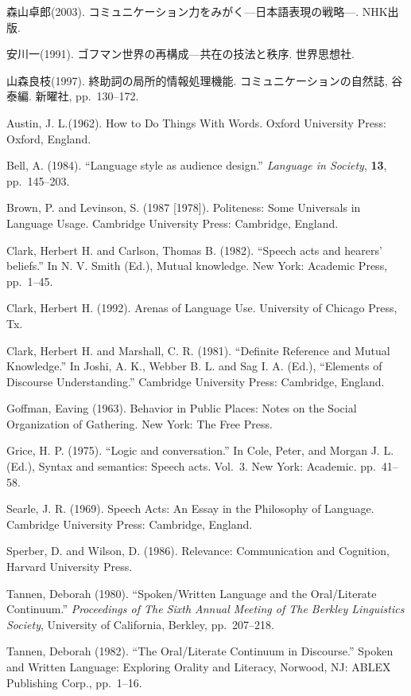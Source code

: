\documentclass[japanese]{jnlp_1.3c}
\begin{document}
\begin{thebibliography}{3}
森山卓郎(2003). コミュニケーション力をみがく—日本語表現の戦略—. NHK出版.
 \item 
安川一(1991). ゴフマン世界の再構成—共在の技法と秩序. 世界思想社.
 \item 
山森良枝(1997). 終助詞の局所的情報処理機能. コミュニケーションの自然誌, 谷泰編. 新曜社, pp.~130--172.
 \item 
Austin, J. L.(1962). How to Do Things With Words. Oxford University Press: Oxford, England. 
 \item 
Bell, A. (1984). ``Language style as audience design.'' \textit{Language in Society}, \textbf{13}, pp.~145--203.
 \item 
Brown, P. and Levinson, S. (1987 [1978]). Politeness: Some Universals in Language Usage.  Cambridge University Press: Cambridge, England.
 \item 
Clark, Herbert H. and Carlson, Thomas B. (1982). ``Speech acts and hearers' beliefs.'' In N. V. Smith (Ed.), Mutual knowledge. New York: Academic Press, pp.~1--45.
 \item 
Clark, Herbert H. (1992). Arenas of Language Use. University of Chicago Press, Tx. 
 \item 
Clark, Herbert H. and Marshall, C. R. (1981). ``Definite Reference and Mutual Knowledge.'' In Joshi, A. K., Webber B. L. and Sag I. A. (Ed.), ``Elements of Discourse Understanding.'' Cambridge University Press: Cambridge, England. 
 \item 
Goffman, Eaving (1963). Behavior in Public Places: Notes on the Social Organization of Gathering. New York: The Free Press.
 \item 
Grice, H. P. (1975). ``Logic and conversation.'' In Cole, Peter, and Morgan J. L. (Ed.), Syntax and semantics: Speech acts. Vol.~3. New York: Academic. pp.~41--58.
 \item 
Searle, J. R. (1969). Speech Acts: An Essay in the Philosophy of Language. Cambridge University Press: Cambridge, England. 
 \item 
Sperber, D. and Wilson, D. (1986). Relevance: Communication and Cognition, Harvard University Press.
 \item 
Tannen, Deborah (1980). ``Spoken/Written Language and the Oral/Literate Continuum.'' \textit{Proceedings of The Sixth Annual Meeting of The Berkley Linguistics Society}, University of California, Berkley, pp.~207--218.
 \item 
Tannen, Deborah (1982). ``The Oral/Literate Continuum in Discourse.'' Spoken and Written Language: Exploring Orality and Literacy, Norwood, NJ: ABLEX Publishing Corp., pp.~1--16.

\end{thebibliography}
\end{document}
